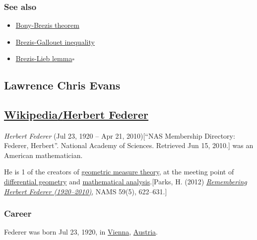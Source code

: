 \documentclass{article}
\begin{document}
\subsubsection{See also}
\begin{itemize}
	\item \href{https://en.wikipedia.org/wiki/Bony%E2%80%93Brezis_theorem}{Bony-Brezis theorem}
	\item \href{https://en.wikipedia.org/wiki/Brezis%E2%80%93Gallouet_inequality}{Brezis-Gallouet inequality}
	\item \href{https://en.wikipedia.org/wiki/Brezis%E2%80%93Lieb_lemma}{Brezis-Lieb lemma}\hfill$\square$
\end{itemize}



\subsection{Lawrence Chris Evans}


\subsection{\href{https://en.wikipedia.org/wiki/Herbert_Federer}{Wikipedia{\tt/}Herbert Federer}}
\textit{Herbert Federer} (Jul 23, 1920 -- Apr 21, 2010)[``NAS Membership Directory: Federer, Herbert''. National Academy of Sciences. Retrieved Jun 15, 2010.] was an American mathematician.

He is 1 of the creators of \href{https://en.wikipedia.org/wiki/Geometric_measure_theory}{geometric measure theory}, at the meeting point of \href{https://en.wikipedia.org/wiki/Differential_geometry}{differential geometry} and \href{https://en.wikipedia.org/wiki/Mathematical_analysis}{mathematical analysis}.[Parks, H. (2012) \href{http://www.ams.org/notices/201205/rtx120500622p.pdf}{\textit{Remembering Herbert Federer (1920--2010)}}, NAMS 59(5), 622--631.]

\subsubsection{Career}
Federer was born Jul 23, 1920, in \href{https://en.wikipedia.org/wiki/Vienna}{Vienna}, \href{https://en.wikipedia.org/wiki/Austria}{Austria}.
\end{document}
